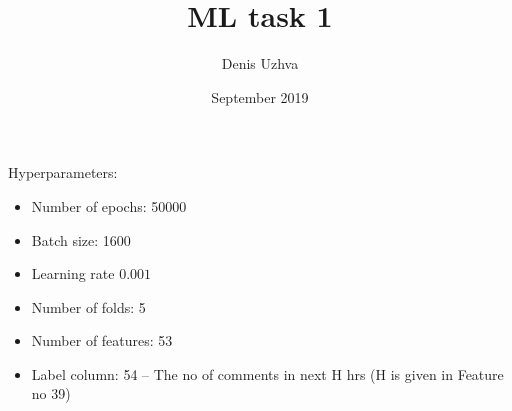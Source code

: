 \documentclass{article}
\begin{document}
\title{ML task 1}
\author{Denis Uzhva}
\date{September 2019}
\maketitle

Hyperparameters:
\begin{itemize}
    \item Number of epochs: 50000
    \item Batch size: 1600
    \item Learning rate $0.001$
    \item Number of folds: 5
    \item Number of features: 53
    \item Label column: 54 -- The no of comments in next H hrs (H is given in Feature no 39)
\end{itemize}
\end{document}
